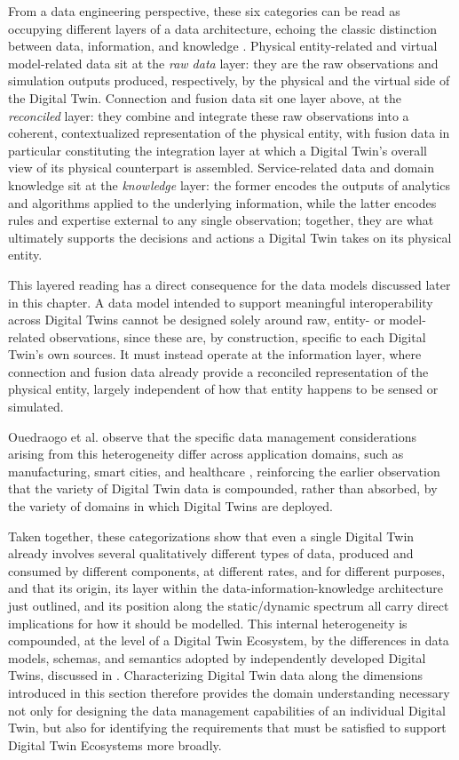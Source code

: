 From a data engineering perspective, these six categories can be read as occupying different layers of a data architecture, echoing the classic distinction between data, information, and knowledge \cite{ackoff1989}. Physical entity-related and virtual model-related data sit at the \emph{raw data} layer: they are the raw observations and simulation outputs produced, respectively, by the physical and the virtual side of the Digital Twin. Connection and fusion data sit one layer above, at the \emph{reconciled} layer: they combine and integrate these raw observations into a coherent, contextualized representation of the physical entity, with fusion data in particular constituting the integration layer at which a Digital Twin's overall view of its physical counterpart is assembled. Service-related data and domain knowledge sit at the \emph{knowledge} layer: the former encodes the outputs of analytics and algorithms applied to the underlying information, while the latter encodes rules and expertise external to any single observation; together, they are what ultimately supports the decisions and actions a Digital Twin takes on its physical entity.

This layered reading has a direct consequence for the data models discussed later in this chapter. A data model intended to support meaningful interoperability across Digital Twins cannot be designed solely around raw, entity- or model-related observations, since these are, by construction, specific to each Digital Twin's own sources. It must instead operate at the information layer, where connection and fusion data already provide a reconciled representation of the physical entity, largely independent of how that entity happens to be sensed or simulated.

Ouedraogo et al. observe that the specific data management considerations arising from this heterogeneity differ across application domains, such as manufacturing, smart cities, and healthcare \cite{ouedraogo2025dtdm}, reinforcing the earlier observation that the variety of Digital Twin data is compounded, rather than absorbed, by the variety of domains in which Digital Twins are deployed.

Taken together, these categorizations show that even a single Digital Twin already involves several qualitatively different types of data, produced and consumed by different components, at different rates, and for different purposes, and that its origin, its layer within the data-information-knowledge architecture just outlined, and its position along the static/dynamic spectrum all carry direct implications for how it should be modelled. This internal heterogeneity is compounded, at the level of a Digital Twin Ecosystem, by the differences in data models, schemas, and semantics adopted by independently developed Digital Twins, discussed in . Characterizing Digital Twin data along the dimensions introduced in this section therefore provides the domain understanding necessary not only for designing the data management capabilities of an individual Digital Twin, but also for identifying the requirements that must be satisfied to support Digital Twin Ecosystems more broadly.

